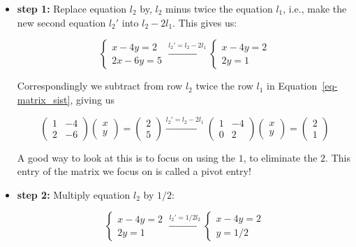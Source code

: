 \documentclass[
  letterpaper,
  DIV=11,
  numbers=noendperiod]{scrartcl}
\theoremstyle{definition}
\theoremstyle{remark}
\begin{document}
\begin{itemize}
\item
  \textbf{step 1:} Replace equation \(l_2\) by, \(l_2\) minus twice the
  equation \(l_1\), i.e., make the new second equation \(l_2'\) into
  \(l_2-2l_1\). This gives us:

  \[
  \begin{cases}x-4y =2\\2x-6y = 5\end{cases} \overset{l_2'=l_2-2l_1}{\longrightarrow}\begin{cases} x-4y =2\\ 2y = 1\end{cases}
  \]

  Correspondingly we subtract from row \(l_2\) twice the row \(l_1\) in
  Equation~\ref{eq-matrix_sist}, giving us

  \[
  \begin{pmatrix} 1 & -4\\ 2 & -6 \end{pmatrix}\begin{pmatrix}x\\y\end{pmatrix}= \begin{pmatrix}2\\5\end{pmatrix}\overset{l_2'=l_2-2l_1}{\longrightarrow} \begin{pmatrix} 1 & -4\\ 0 & 2 \end{pmatrix}\begin{pmatrix}x\\y\end{pmatrix}= \begin{pmatrix}2\\1\end{pmatrix}
  \]

  A good way to look at this is to focus on using the \(1\), to
  eliminate the \(2\). This entry of the matrix we focus on is called a
  pivot entry!
\item
  \textbf{step 2:} Multiply equation \(l_2\) by \(1/2\):

  \[
  \begin{cases} x-4y =2\\ 2y = 1\end{cases}\overset{l_2'=1/2l_2}{\longrightarrow} \begin{cases} x-4y =2\\ y = 1/2\end{cases}
  \]


\end{itemize}
\end{document}
